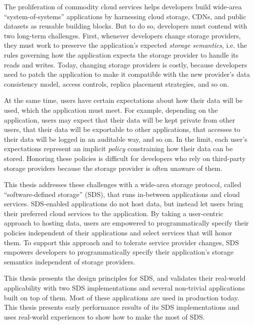 The proliferation of commodity cloud services helps developers build
wide-area ``system-of-systems'' applications by harnessing
cloud storage, CDNs, and public datasets as reusable building blocks.
But to do so, developers must contend with two
long-term challenges.  First, whenever developers change storage providers, 
they must work to preserve the application's expected \emph{storage
semantics}, i.e. the rules governing how the application expects the
storage provider to handle its reads and writes.  Today, changing
storage providers is costly, because developers need to patch
the application to make it compatible with the new provider's
data consistency model, access controls, replica placement
strategies, and so on.

At the same time, users have certain expectations about how their
data will be used, which the application must meet.
For example, depending on the application, users
may expect that their data will be kept private from other users, that their data will be exportable
to other applications, that accesses to their data will be logged in an auditable way,
and so on.  In the limit, each user's expectations represent an implicit
\emph{policy} constraining how their data can be stored.  Honoring
these policies is difficult for developers who rely on third-party storage
providers because the storage provider is often unaware of them.

This thesis addresses these challenges with a wide-area storage protocol, called ``software-defined
storage'' (SDS), that runs in-between applications and cloud services.
SDS-enabled applications do not host data, but instead let users
bring their preferred cloud services to the application.  By taking a
user-centric approach to hosting data, users are empowered to programmatically
specify their policies independent of their applications and select
services that will honor them.  To support this approach and to
tolerate service provider changes, SDS empowers developers to programmatically
specify their application's storage semantics independent of storage providers.

This thesis presents the design principles for SDS, and validates their
real-world applicability with two SDS implementations and several non-trivial
applications built on top of them.  Most of these applications are used in
production today.  This thesis
presents early performance results of its SDS implementations and uses
real-world experiences to show how to make the most of SDS.
